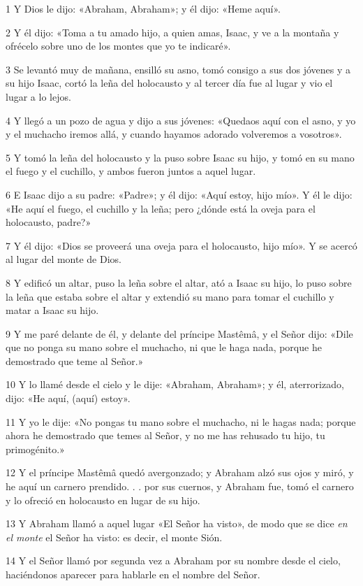 \par 1 Y Dios le dijo: «Abraham, Abraham»; y él dijo: «Heme aquí».
\par 2 Y él dijo: «Toma a tu amado hijo, a quien amas, Isaac, y ve a la montaña y ofrécelo sobre uno de los montes que yo te indicaré».
\par 3 Se levantó muy de mañana, ensilló su asno, tomó consigo a sus dos jóvenes y a su hijo Isaac, cortó la leña del holocausto y al tercer día fue al lugar y vio el lugar a lo lejos.
\par 4 Y llegó a un pozo de agua y dijo a sus jóvenes: «Quedaos aquí con el asno, y yo y el muchacho iremos allá, y cuando hayamos adorado volveremos a vosotros».
\par 5 Y tomó la leña del holocausto y la puso sobre Isaac su hijo, y tomó en su mano el fuego y el cuchillo, y ambos fueron juntos a aquel lugar.
\par 6 E Isaac dijo a su padre: «Padre»; y él dijo: «Aquí estoy, hijo mío». Y él le dijo: «He aquí el fuego, el cuchillo y la leña; pero ¿dónde está la oveja para el holocausto, padre?»
\par 7 Y él dijo: «Dios se proveerá una oveja para el holocausto, hijo mío». Y se acercó al lugar del monte de Dios.
\par 8 Y edificó un altar, puso la leña sobre el altar, ató a Isaac su hijo, lo puso sobre la leña que estaba sobre el altar y extendió su mano para tomar el cuchillo y matar a Isaac su hijo.
\par 9 Y me paré delante de él, y delante del príncipe Mastêmâ, y el Señor dijo: «Dile que no ponga su mano sobre el muchacho, ni que le haga nada, porque he demostrado que teme al Señor.»
\par 10 Y lo llamé desde el cielo y le dije: «Abraham, Abraham»; y él, aterrorizado, dijo: «He aquí, (aquí) estoy».
\par 11 Y yo le dije: «No pongas tu mano sobre el muchacho, ni le hagas nada; porque ahora he demostrado que temes al Señor, y no me has rehusado tu hijo, tu primogénito.»
\par 12 Y el príncipe Mastêmâ quedó avergonzado; y Abraham alzó sus ojos y miró, y he aquí un carnero prendido. . . por sus cuernos, y Abraham fue, tomó el carnero y lo ofreció en holocausto en lugar de su hijo.
\par 13 Y Abraham llamó a aquel lugar «El Señor ha visto», de modo que se dice \textit{en el monte} el Señor ha visto: es decir, el monte Sión.
\par 14 Y el Señor llamó por segunda vez a Abraham por su nombre desde el cielo, haciéndonos aparecer para hablarle en el nombre del Señor.

